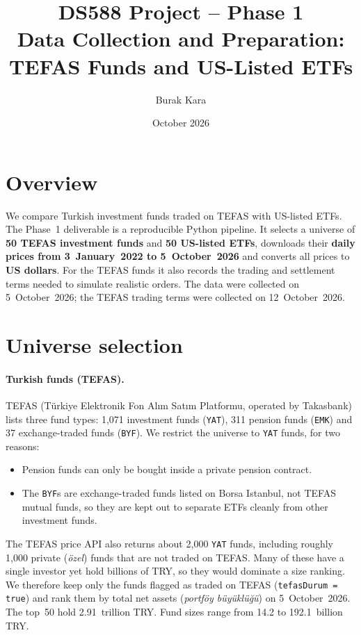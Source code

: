 \documentclass[11pt,a4paper]{article}
\title{DS588 Project -- Phase 1\\[2pt] \large Data Collection and Preparation: TEFAS Funds and US-Listed ETFs}
\author{Burak Kara}
\date{October 2026}
\newcommand{\code}[1]{\texttt{\small #1}}
\begin{document}
\maketitle

\section{Overview}
We compare Turkish investment funds traded on TEFAS with US-listed ETFs.
The Phase~1 deliverable is a reproducible Python pipeline. It selects a universe of
\textbf{50 TEFAS investment funds} and \textbf{50 US-listed ETFs}, downloads their
\textbf{daily prices from 3~January~2022 to 5~October~2026} and converts all prices to
\textbf{US dollars}. For the TEFAS funds it also records the trading and settlement terms
needed to simulate realistic orders.
The data were collected on 5~October~2026; the TEFAS trading terms were collected on
12~October~2026.

\section{Universe selection}
\paragraph{Turkish funds (TEFAS).}
TEFAS (Türkiye Elektronik Fon Alım Satım Platformu, operated by Takasbank) lists three
fund types: 1{,}071 investment funds (\code{YAT}), 311 pension funds (\code{EMK}) and
37 exchange-traded funds (\code{BYF}).
We restrict the universe to \code{YAT} funds, for two reasons:
\begin{itemize}
  \item Pension funds can only be bought inside a private pension contract.
  \item The \code{BYF}s are exchange-traded funds listed on Borsa Istanbul, not TEFAS mutual
        funds, so they are kept out to separate ETFs cleanly from other investment funds.
\end{itemize}
The TEFAS price API also returns about 2{,}000 \code{YAT} funds, including roughly
1{,}000 private (\emph{özel}) funds that are not traded on TEFAS. Many of these have a
single investor yet hold billions of TRY, so they would dominate a size ranking. We
therefore keep only the funds flagged as traded on TEFAS (\code{tefasDurum = true}) and
rank them by total net assets (\emph{portföy büyüklüğü}) on 5~October~2026. The top~50
hold 2.91~trillion TRY. Fund sizes range from 14.2 to 192.1~billion TRY.
\end{document}
